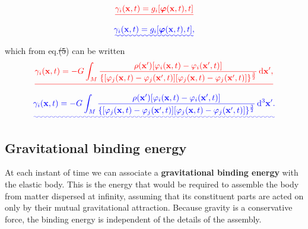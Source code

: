 \documentclass[a4paper,12pt]{paper}
\providecommand{\DIFadd}[1]{{\protect\color{blue}\uwave{#1}}} %
\providecommand{\DIFdel}[1]{{\protect\color{red}\sout{#1}}}                      %
\providecommand{\DIFaddbegin}{} %
\providecommand{\DIFaddend}{} %
\providecommand{\DIFdelbegin}{} %
\providecommand{\DIFdelend}{} %
\begin{document}
\DIFdelbegin \begin{displaymath}
\DIFdel{\gamma_{i}(\mathbf{x},t)=g_{i}[\bphi(\mathbf{x},t),t]
}\end{displaymath}%
\DIFdelend \DIFaddbegin \begin{equation}
\DIFadd{\gamma_{i}(\mathbf{x},t)=g_{i}[\bphi(\mathbf{x},t),t],
\label{eq:9}
}\end{equation}\DIFaddend 
which from eq.\DIFdelbegin \DIFdel{(5}\DIFdelend \DIFaddbegin \DIFadd{~(\ref{eq:5}}\DIFaddend ) can be written
\DIFdelbegin \begin{displaymath}
\DIFdel{\gamma_{i}(\mathbf{x},t)=-G\int_{M}\frac{\rho(\mathbf{x}')[\varphi_{i}(\mathbf{x},t)-\varphi_{i}(\mathbf{x}',t)]}{\{[\varphi_{j}(\mathbf{x},t)-\varphi_{j}(\mathbf{x}',t)][\varphi_{j}(\mathbf{x},t)-\varphi_{j}(\mathbf{x}',t)]\}^{\frac{3}{2}}}\dd\mathbf{x}',
}\end{displaymath}%
\DIFdelend \DIFaddbegin \begin{equation}
\DIFadd{\gamma_{i}(\mathbf{x},t)=-G\int_{M}\frac{\rho(\mathbf{x}')[\varphi_{i}(\mathbf{x},t)-\varphi_{i}(\mathbf{x}',t)]}{\{[\varphi_{j}(\mathbf{x},t)-\varphi_{j}(\mathbf{x}',t)][\varphi_{j}(\mathbf{x},t)-\varphi_{j}(\mathbf{x}',t)]\}^{\frac{3}{2}}}\dd^{3}\mathbf{x}'.
\label{eq:10}
}\end{equation}\DIFaddend 

\subsection*{Gravitational binding energy}

At each instant of time we can associate a \textbf{gravitational binding energy} with the elastic body. This is the energy 
that would be required to assemble the body from matter dispersed at infinity, assuming that its constituent parts 
are acted on only by their mutual gravitational attraction. Because gravity is a conservative force, the binding 
energy is independent of the details of the assembly. 
\end{document}
